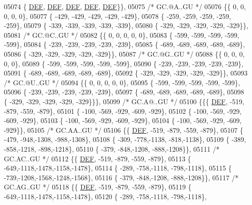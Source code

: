 \begin{DoxyCode}
05074 \{  \mbox{\hyperlink{1_88_84__epars_8h_a397419fc12b37ed479c8abb9d444d843}{DEF}},  \mbox{\hyperlink{1_88_84__epars_8h_a397419fc12b37ed479c8abb9d444d843}{DEF}},  \mbox{\hyperlink{1_88_84__epars_8h_a397419fc12b37ed479c8abb9d444d843}{DEF}},  \mbox{\hyperlink{1_88_84__epars_8h_a397419fc12b37ed479c8abb9d444d843}{DEF}},  \mbox{\hyperlink{1_88_84__epars_8h_a397419fc12b37ed479c8abb9d444d843}{DEF}}\}\},
05075 \textcolor{comment}{/* GC.@A..GU */}
05076 \{\{    0,    0,    0,    0,    0\},
05077 \{ -429, -429, -429, -429, -429\},
05078 \{ -259, -259, -259, -259, -259\},
05079 \{ -339, -339, -339, -339, -339\},
05080 \{ -329, -329, -329, -329, -329\}\},
05081 \textcolor{comment}{/* GC.@C..GU */}
05082 \{\{    0,    0,    0,    0,    0\},
05083 \{ -599, -599, -599, -599, -599\},
05084 \{ -239, -239, -239, -239, -239\},
05085 \{ -689, -689, -689, -689, -689\},
05086 \{ -329, -329, -329, -329, -329\}\},
05087 \textcolor{comment}{/* GC.@G..GU */}
05088 \{\{    0,    0,    0,    0,    0\},
05089 \{ -599, -599, -599, -599, -599\},
05090 \{ -239, -239, -239, -239, -239\},
05091 \{ -689, -689, -689, -689, -689\},
05092 \{ -329, -329, -329, -329, -329\}\},
05093 \textcolor{comment}{/* GC.@U..GU */}
05094 \{\{    0,    0,    0,    0,    0\},
05095 \{ -599, -599, -599, -599, -599\},
05096 \{ -239, -239, -239, -239, -239\},
05097 \{ -689, -689, -689, -689, -689\},
05098 \{ -329, -329, -329, -329, -329\}\}\},
05099 \textcolor{comment}{/* GC.A@..GU */}
05100 \{\{\{  \mbox{\hyperlink{1_88_84__epars_8h_a397419fc12b37ed479c8abb9d444d843}{DEF}}, -519, -879, -559, -879\},
05101 \{ -100, -569, -929, -609, -929\},
05102 \{ -100, -569, -929, -609, -929\},
05103 \{ -100, -569, -929, -609, -929\},
05104 \{ -100, -569, -929, -609, -929\}\},
05105 \textcolor{comment}{/* GC.AA..GU */}
05106 \{\{  \mbox{\hyperlink{1_88_84__epars_8h_a397419fc12b37ed479c8abb9d444d843}{DEF}}, -519, -879, -559, -879\},
05107 \{ -479, -948,-1308, -988,-1308\},
05108 \{ -309, -778,-1138, -818,-1138\},
05109 \{ -389, -858,-1218, -898,-1218\},
05110 \{ -379, -848,-1208, -888,-1208\}\},
05111 \textcolor{comment}{/* GC.AC..GU */}
05112 \{\{  \mbox{\hyperlink{1_88_84__epars_8h_a397419fc12b37ed479c8abb9d444d843}{DEF}}, -519, -879, -559, -879\},
05113 \{ -649,-1118,-1478,-1158,-1478\},
05114 \{ -289, -758,-1118, -798,-1118\},
05115 \{ -739,-1208,-1568,-1248,-1568\},
05116 \{ -379, -848,-1208, -888,-1208\}\},
05117 \textcolor{comment}{/* GC.AG..GU */}
05118 \{\{  \mbox{\hyperlink{1_88_84__epars_8h_a397419fc12b37ed479c8abb9d444d843}{DEF}}, -519, -879, -559, -879\},
05119 \{ -649,-1118,-1478,-1158,-1478\},
05120 \{ -289, -758,-1118, -798,-1118\},

\end{DoxyCode}
